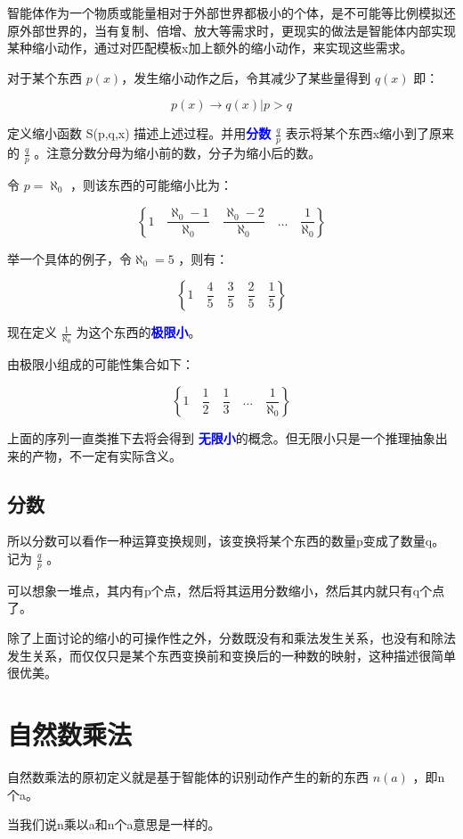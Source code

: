 \documentclass[12pt,oneside]{book}
\renewcommand{\emph}[1]{\textcolor{blue}{\textbf{#1}}}
\begin{document}
智能体作为一个物质或能量相对于外部世界都极小的个体，是不可能等比例模拟还原外部世界的，当有复制、倍增、放大等需求时，更现实的做法是智能体内部实现某种缩小动作，通过对匹配模板x加上额外的缩小动作，来实现这些需求。

对于某个东西 $p(x)$，发生缩小动作之后，令其减少了某些量得到 $q(x)$ 即：

\[
p(x) \to q(x)   | p>q
\]

定义缩小函数 S(p,q,x) 描述上述过程。并用\emph{分数} $\frac{q}{p}$ 表示将某个东西x缩小到了原来的 $\frac{q}{p}$ 。注意分数分母为缩小前的数，分子为缩小后的数。


令 $p=\aleph_0$ ，则该东西的可能缩小比为：

\[
\left\{1 \quad \frac{\aleph_0-1}{\aleph_0} \quad \frac{\aleph_0-2}{\aleph_0} \quad  ...  \quad \frac{1}{\aleph_0} \right\}
\]

举一个具体的例子，令$\aleph_0 = 5$ ，则有：

\[
\left\{1 \quad \frac{4}{5} \quad \frac{3}{5} \quad  \frac{2}{5}  \quad \frac{1}{5} \right\}
\]

现在定义 $\frac{1}{\aleph_0}$ 为这个东西的\emph{极限小}。

由极限小组成的可能性集合如下：

\[
\left\{1 \quad \frac{1}{2} \quad \frac{1}{3} \quad  ...  \quad \frac{1}{\aleph_0} \right\}
\]


上面的序列一直类推下去将会得到 \emph{无限小}的概念。但无限小只是一个推理抽象出来的产物，不一定有实际含义。

\subsection{分数}
所以分数可以看作一种运算变换规则，该变换将某个东西的数量p变成了数量q。记为 $\frac{q}{p}$ 。

可以想象一堆点，其内有p个点，然后将其运用分数缩小，然后其内就只有q个点了。

除了上面讨论的缩小的可操作性之外，分数既没有和乘法发生关系，也没有和除法发生关系，而仅仅只是某个东西变换前和变换后的一种数的映射，这种描述很简单很优美。



\section{自然数乘法}
自然数乘法的原初定义就是基于智能体的识别动作产生的新的东西 $n(a)$ ，即n个a。

当我们说n乘以a和n个a意思是一样的。
\end{document}
